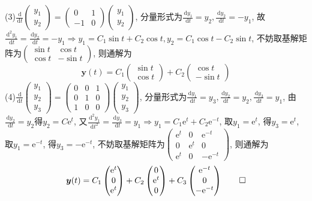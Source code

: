 \documentclass[titlepage,11pt,a4paper,twoside]{report}
\makeatletter
\newcommand\diff{\,\mathrm{d}}
\newcommand\e{\mathrm{e}}
\newenvironment{solve}{\par
	\pushQED{\qed}%
	\normalfont \topsep1\p@\@plus6\p@\relax
	\trivlist
	\item\relax
	{\hspace*{\parindent}{\heiti 解}\@addpunct{:}}\hspace\labelsep\ignorespaces
}{%
	\popQED\endtrivlist\@endpefalse
}
\makeatother
\begin{document}
\begin{solve}
(3)$\displaystyle\frac{\diff}{\diff t}\begin{pmatrix}y_1\\y_2\end{pmatrix}=\begin{pmatrix}0&1\\-1&0\end{pmatrix}\begin{pmatrix}y_1\\y_2\end{pmatrix}$, 分量形式为$\displaystyle\frac{\diff y_1}{\diff t}=y_2,\frac{\diff y_2}{\diff t}=-y_1$, 故$\displaystyle\frac{\diff^2y_1}{\diff t}=\frac{\diff y_2}{\diff t}=-y_1\Rightarrow y_1=C_1\sin t+C_2\cos t,y_2=C_1\cos t-C_2\sin t$, 不妨取基解矩阵为$\begin{pmatrix}\sin t&\cos t\\\cos t&-\sin t\end{pmatrix}$, 则通解为
\[\bm{y}(t)=C_1\begin{pmatrix}\sin t\\\cos t\end{pmatrix}+C_2\begin{pmatrix}\cos t\\-\sin t\end{pmatrix}\]
(4)$\displaystyle\frac{\diff}{\diff t}\begin{pmatrix}y_1\\y_2\\y_3\end{pmatrix}=\begin{pmatrix}0&0&1\\0&1&0\\1&0&0\end{pmatrix}\begin{pmatrix}y_1\\y_2\\y_3\end{pmatrix}$, 分量形式为$\displaystyle\frac{\diff y_1}{\diff t}=y_3,\frac{\diff y_2}{\diff t}=y_2,\frac{\diff y_3}{\diff t}=y_1$, 由$\displaystyle\frac{\diff y_2}{\diff t}=y_2$得$y_2=C\e^t$, 又$\displaystyle\frac{\diff^2y_1}{\diff t^2}=\frac{\diff y_3}{\diff t}=y_1\Rightarrow y_1=C_1\e^t+C_2\e^{-t}$, 取$y_1=\e^t$, 得$y_3=\e^t$, 取$y_1=\e^{-t}$, 得$y_3=-\e^{-t}$, 不妨取基解矩阵为$\begin{pmatrix}\e^t&0&\e^{-t}\\0&\e^t&0\\\e^t&0&-\e^{-t}\end{pmatrix}$, 则通解为
\[\bm{y}(t)=C_1\begin{pmatrix}\e^t\\0\\\e^t\end{pmatrix}+C_2\begin{pmatrix}0\\\e^t\\0\end{pmatrix}+C_3\begin{pmatrix}\e^{-t}\\0\\-\e^{-t}\end{pmatrix}\qedhere\]
\end{solve}
\end{document}

